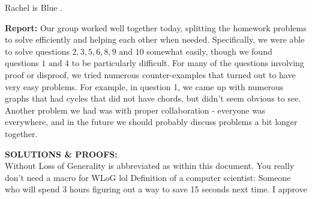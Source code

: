 \color{blue} Rachel is Blue . 
\color{black}

\textbf{Report:} Our group worked well together today, splitting the homework problems to solve efficiently and helping each other when needed. Specifically, we were able to solve questions $2, 3, 5, 6, 8, 9 \text{ and } 10$ somewhat easily, though we found questions $1 \text{ and } 4$ to be particularly difficult. For many of the questions involving proof or disproof, we tried numerous counter-examples that turned out to have very easy problems. For example, in question 1, we came up with numerous graphs that had cycles that did not have chords, but didn't seem obvious to see. Another problem we had was with proper collaboration - everyone was everywhere, and in the future we should probably discuss problems a bit longer together.

\divider

\textbf{SOLUTIONS \& PROOFS:}\\
Without Loss of Generality is abbreviated as \WLoG{} within this document.
\color{red} You really don't need a macro for WLoG lol \color{black} \color{green}Definition of a computer scientist: Someone who will spend 3 hours figuring out a way to save 15 seconds next time. I approve\color{black}

